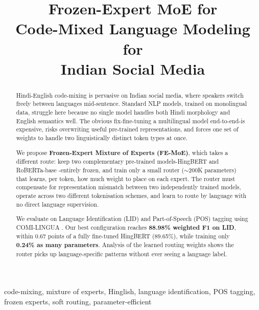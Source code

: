 \documentclass[conference]{IEEEtran}
\begin{document}
\title{Frozen-Expert MoE for\\Code-Mixed Language Modeling for\\Indian Social Media}

\author{
}

\maketitle

\begin{abstract}
Hindi-English code-mixing is pervasive on Indian social media, where speakers switch freely between languages mid-sentence. Standard NLP models, trained on monolingual data, struggle here because no single model handles both Hindi morphology and English semantics well. The obvious fix-fine-tuning a multilingual model end-to-end-is expensive, risks overwriting useful pre-trained representations, and forces one set of weights to handle two linguistically distinct token types at once.

We propose \textbf{Frozen-Expert Mixture of Experts (FE-MoE)}, which takes a different route: keep two complementary pre-trained models-HingBERT \cite{nayak2022hingbert} and RoBERTa-base \cite{liu2019roberta}-entirely frozen, and train only a small router ($\sim$200K parameters) that learns, per token, how much weight to place on each expert. The router must compensate for representation mismatch between two independently trained models, operate across two different tokenisation schemes, and learn to route by language with no direct language supervision.

We evaluate on Language Identification (LID) and Part-of-Speech (POS) tagging using COMI-LINGUA \cite{sheth2024comilingua}. Our best configuration reaches \textbf{88.98\% weighted F1 on LID}, within 0.67 points of a fully fine-tuned HingBERT (89.65\%), while training only \textbf{0.24\% as many parameters}. Analysis of the learned routing weights shows the router picks up language-specific patterns without ever seeing a language label.
\end{abstract}

\begin{IEEEkeywords}
code-mixing, mixture of experts, Hinglish, language identification, POS tagging, frozen experts, soft routing, parameter-efficient
\end{IEEEkeywords}
\end{document}
